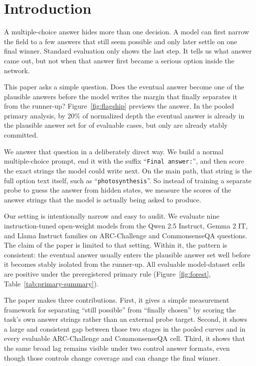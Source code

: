 \section{Introduction}

A multiple-choice answer hides more than one decision. A model can first narrow the field to a few answers that still seem possible and only later settle on one final winner. Standard evaluation only shows the last step. It tells us what answer came out, but not when that answer first became a serious option inside the network.

This paper asks a simple question. Does the eventual answer become one of the plausible answers before the model writes the margin that finally separates it from the runner-up? Figure~\ref{fig:flagship} previews the answer. In the pooled primary analysis, by 20\% of normalized depth the eventual answer is already in the plausible answer set for \FlagshipTwentyPlausiblePct{} of evaluable cases, but only \FlagshipTwentyCommittedPct{} are already stably committed.

We answer that question in a deliberately direct way. We build a normal multiple-choice
prompt, end it with the suffix ``\texttt{Final answer:}'', and then score the exact strings the
model could write next. On the main path, that string is the full option text itself, such
as ``\texttt{photosynthesis}''. So instead of training a separate probe to guess the answer
from hidden states, we measure the scores of the answer strings that the model is actually
being asked to produce.

Our setting is intentionally narrow and easy to audit. We evaluate nine instruction-tuned
open-weight models from the Qwen 2.5 Instruct, Gemma 2 IT, and Llama Instruct families
on \PaperPromptCount{} ARC-Challenge and CommonsenseQA questions. The claim of the
paper is limited to that setting. Within it, the pattern is consistent: the eventual answer
usually enters the plausible answer set well before it becomes stably isolated from the
runner-up. All \ArcCsqaPositiveCells{} evaluable model-dataset cells are positive under the
preregistered primary rule (Figure~\ref{fig:forest}, Table~\ref{tab:primary-summary}).

The paper makes three contributions. First, it gives a simple measurement framework for
separating ``still possible'' from ``finally chosen'' by scoring the task's own answer strings
rather than an external probe target. Second, it shows a large and consistent gap between
those two stages in the pooled curves and in every evaluable ARC-Challenge and
CommonsenseQA cell. Third, it shows that the same broad lag remains visible under two
control answer formats, even though those controls change coverage and can change the
final winner.

